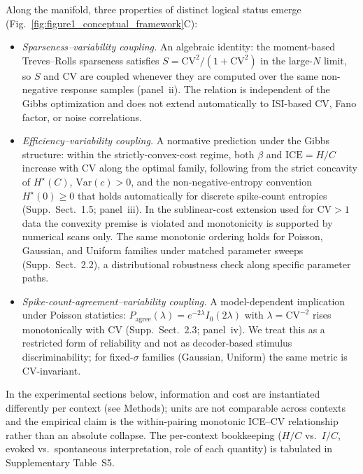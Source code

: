 Along the manifold, three properties of distinct logical status emerge (Fig.~\ref{fig:figure1_conceptual_framework}C):
\begin{itemize}
    \item \emph{Sparseness--variability coupling.} An algebraic identity: the moment-based Treves--Rolls sparseness satisfies $S = \mathrm{CV}^2/(1+\mathrm{CV}^2)$ in the large-$N$ limit, so $S$ and CV are coupled whenever they are computed over the same non-negative response samples (panel~ii).  The relation is independent of the Gibbs optimization and does not extend automatically to ISI-based CV, Fano factor, or noise correlations.

    \item \emph{Efficiency--variability coupling.} A normative prediction under the Gibbs structure: within the strictly-convex-cost regime, both $\beta$ and $\mathrm{ICE}=H/C$ increase with CV along the optimal family, following from the strict concavity of $H^\star(C)$, $\mathrm{Var}(c)>0$, and the non-negative-entropy convention $H^\star(0)\ge 0$ that holds automatically for discrete spike-count entropies (Supp.~Sect.~1.5; panel~iii).  In the sublinear-cost extension used for CV$>1$ data the convexity premise is violated and monotonicity is supported by numerical scans only.  The same monotonic ordering holds for Poisson, Gaussian, and Uniform families under matched parameter sweeps (Supp.~Sect.~2.2), a distributional robustness check along specific parameter paths.

    \item \emph{Spike-count-agreement--variability coupling.} A model-dependent implication under Poisson statistics: $P_{\mathrm{agree}}(\lambda)=e^{-2\lambda}I_0(2\lambda)$ with $\lambda=\mathrm{CV}^{-2}$ rises monotonically with CV (Supp.~Sect.~2.3; panel~iv).  We treat this as a restricted form of reliability and not as decoder-based stimulus discriminability; for fixed-$\sigma$ families (Gaussian, Uniform) the same metric is CV-invariant.
\end{itemize}

In the experimental sections below, information and cost are instantiated differently per context (see Methods); units are not comparable across contexts and the empirical claim is the within-pairing monotonic ICE--CV relationship rather than an absolute collapse.  The per-context bookkeeping ($H/C$ vs.\ $I/C$, evoked vs.\ spontaneous interpretation, role of each quantity) is tabulated in Supplementary Table~S5.

